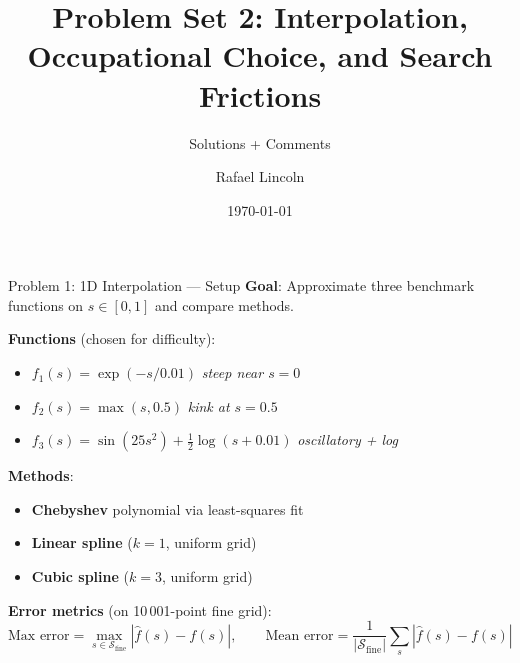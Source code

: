 \documentclass[aspectratio=169,11pt]{beamer}
\title{Problem Set 2: Interpolation, Occupational Choice, and Search Frictions}
\subtitle{Solutions + Comments}
\author{Rafael Lincoln}
\institute{New York University}
\date{\today}
\begin{document}
\begin{frame}[plain]
    \titlepage
\end{frame}


\begin{frame}{Problem 1: 1D Interpolation --- Setup}
    \textbf{Goal}: Approximate three benchmark functions on $s\in[0,1]$ and compare methods.
    \vspace{0.3em}

    \textbf{Functions} (chosen for difficulty):
    \begin{itemize}\setlength\itemsep{0pt}
        \item $f_1(s) = \exp(-s/0.01)$ \hfill \textit{steep near $s=0$}
        \item $f_2(s) = \max(s, 0.5)$ \hfill \textit{kink at $s=0.5$}
        \item $f_3(s) = \sin(25s^2) + \tfrac{1}{2}\log(s+0.01)$ \hfill \textit{oscillatory + log}
    \end{itemize}
    \vspace{0.3em}

    \textbf{Methods}: 
    \begin{itemize}\setlength\itemsep{0pt}
        \item \textbf{Chebyshev} polynomial via least-squares fit
        \item \textbf{Linear spline} ($k=1$, uniform grid)
        \item \textbf{Cubic spline} ($k=3$, uniform grid)
    \end{itemize}
    
    \textbf{Error metrics} (on 10\,001-point fine grid):
    \[
    \text{Max error} = \max_{s\in\mathcal{S}_{\text{fine}}} |\hat f(s) - f(s)|,
    \qquad
    \text{Mean error} = \frac{1}{|\mathcal{S}_{\text{fine}}|}\sum_s |\hat f(s) - f(s)|
    \]
\end{frame}
\end{document}
